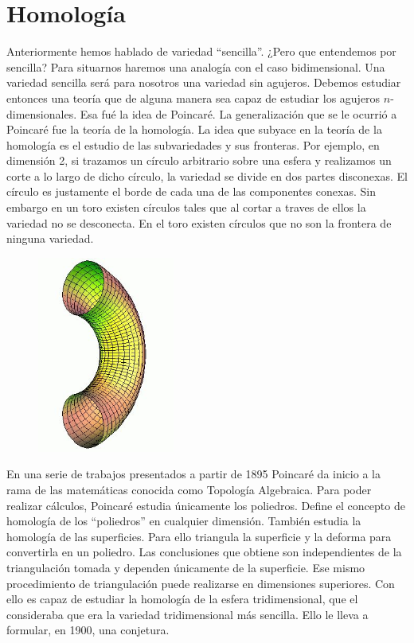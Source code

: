 \documentclass[a4paper, 12pt]{article}
\begin{document}
\newpage

\section*{Homología}

Anteriormente hemos hablado de variedad ``sencilla''.    ¿Pero que entendemos por sencilla?  Para situarnos haremos una analogía con el caso bidimensional.  Una variedad sencilla será para nosotros una variedad sin agujeros.  Debemos estudiar entonces una teoría que de alguna manera sea capaz de estudiar los agujeros $n$-dimensionales.  Esa fué la idea de Poincaré.  La generalización que se le ocurrió a Poincaré fue la teoría de la homología. 
La idea que subyace en la teoría de la homología es el estudio de las subvariedades y sus fronteras.  Por ejemplo, en dimensión 2, si trazamos un círculo arbitrario sobre una esfera y realizamos un corte a lo largo de dicho círculo, la variedad se divide en dos partes disconexas.  El círculo es justamente el borde de cada una de las componentes conexas.  Sin embargo en un toro existen círculos tales que al cortar a traves de ellos la variedad no se desconecta.  En el toro existen círculos que no son la frontera de ninguna variedad.

\begin{figure}[htbp]
	\centering
		\includegraphics[width=0.40\textwidth]{imagenes/torocortado.jpg}
	\end{figure}


   En una serie de trabajos presentados a partir de 1895  Poincaré da inicio a la rama de las matemáticas conocida como Topología Algebraica. Para poder realizar cálculos, Poincaré estudia únicamente los poliedros. Define el concepto de homología de los ``poliedros'' en cualquier dimensión.  También estudia la homología de las superficies.  Para ello triangula la superficie y la deforma para convertirla en un poliedro. Las conclusiones que obtiene son independientes de la triangulación tomada y  dependen únicamente de la superficie.  Ese mismo procedimiento de triangulación puede realizarse en dimensiones superiores.   Con ello es capaz de estudiar la homología de la esfera tridimensional, que el consideraba que era la variedad tridimensional más sencilla.  Ello le lleva a formular, en 1900, una conjetura.
\end{document}
